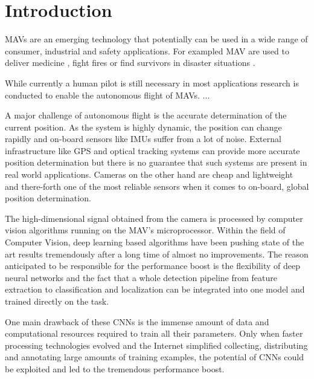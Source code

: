 \chapter{Introduction}
\label{sec:intro}

\acp{MAV} are an emerging technology that potentially can be used in a wide range of consumer, industrial and safety applications. For exampled \ac{MAV} are used to deliver medicine , fight fires  or find survivors in disaster situations .

While currently a human pilot is still necessary in most applications research is conducted to enable the autonomous flight of \acp{MAV}. ...

A major challenge of autonomous flight is the accurate determination of the current position. As the system is highly dynamic, the position can change rapidly and on-board sensors like \acp{IMU} suffer from a lot of noise. External infrastructure like GPS and optical tracking systems can provide more accurate position determination but there is no guarantee that such systems are present in real world applications. Cameras on the other hand are cheap and lightweight and there-forth one of the most reliable sensors when it comes to on-board, global position determination.

The high-dimensional signal obtained from the camera is processed by computer vision algorithms running on the \ac{MAV}'s microprocessor. Within the field of Computer Vision, deep learning based algorithms have been pushing state of the art results tremendously after a long time of almost no improvements. The reason anticipated to be responsible for the performance boost is the flexibility of deep neural networks and the fact that a whole detection pipeline from feature extraction to classification and localization can be integrated into one model and trained directly on the task.

One main drawback of these \acp{CNN} is the immense amount of data and computational resources required to train all their parameters. Only when faster processing technologies evolved and the Internet simplified collecting, distributing and annotating large amounts of training examples, the potential of \acp{CNN} could be exploited  and led to the tremendous performance boost.

